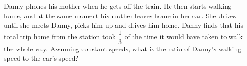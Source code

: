 Danny phones his mother when he gets off the train. He then starts walking home, and at the same moment his mother leaves home in her car. She drives until she meets Danny, picks him up and drives him home. Danny finds that his total trip home from the station took $\dfrac13$ of the time it would have taken to walk the whole way. Assuming constant speeds, what is the ratio of Danny's walking speed to the car's speed?
